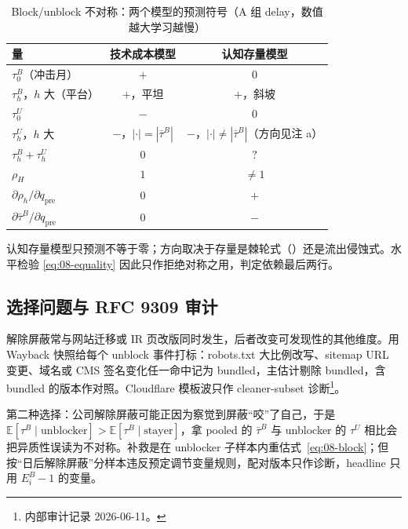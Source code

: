 \documentclass[a4paper,11pt]{ctexart}
\begin{document}
\begin{table}[htbp]
\centering
\caption{Block/unblock 不对称：两个模型的预测符号（A 组 delay，数值越大学习越慢）}
\label{tab:08-predictions}
\begin{threeparttable}
\begin{tabular}{lcc}
\toprule
量 & 技术成本模型 & 认知存量模型 \\
\midrule
$\tau^{B}_0$（冲击月） & $+$ & $0$ \\
$\tau^{B}_h$，$h$ 大（平台） & $+$，平坦 & $+$，斜坡 \\
$\tau^{U}_0$ & $-$ & $0$ \\
$\tau^{U}_h$，$h$ 大 & $-$，$|\cdot|=|\bar\tau^{B}|$ & $-$，$|\cdot|\neq|\bar\tau^{B}|$（方向见注 a） \\
$\tau^{B}_h+\tau^{U}_h$ & $0$ & $?$\tnote{a} \\
$\rho_H$ & $1$ & $\neq 1$ \\
$\partial\rho_h/\partial q_{\mathrm{pre}}$ & $0$ & $+$ \\
$\partial\bar\tau^{B}/\partial q_{\mathrm{pre}}$ & $0$ & $-$ \\
\bottomrule
\end{tabular}
\begin{tablenotes}\footnotesize
\item[a] 认知存量模型只预测不等于零；方向取决于存量是棘轮式（\citet{chennoronhasingal2004}）还是流出侵蚀式。水平检验 \eqref{eq:08-equality} 因此只作拒绝对称之用，判定依赖最后两行。
\end{tablenotes}
\end{threeparttable}
\end{table}

\subsection{选择问题与 RFC 9309 审计}\label{sec:08-selection}

解除屏蔽常与网站迁移或 IR 页改版同时发生，后者改变可发现性的其他维度。用 Wayback 快照给每个 unblock 事件打标：robots.txt 大比例改写、sitemap URL 变更、域名或 CMS 签名变化任一命中记为 bundled，主估计剔除 bundled，含 bundled 的版本作对照。Cloudflare 模板波只作 cleaner-subset 诊断\footnote{内部审计记录 2026-06-11。}。

第二种选择：公司解除屏蔽可能正因为察觉到屏蔽“咬”了自己，于是 $\mathbb{E}[\tau^{B}\mid \text{unblocker}]>\mathbb{E}[\tau^{B}\mid \text{stayer}]$，拿 pooled 的 $\bar\tau^{B}$ 与 unblocker 的 $\tau^{U}$ 相比会把异质性误读为不对称。补救是在 unblocker 子样本内重估式~\eqref{eq:08-block}；但按“日后解除屏蔽”分样本违反预定调节变量规则，配对版本只作诊断，headline 只用 $E^{B}_i-1$ 的变量。
\end{document}
